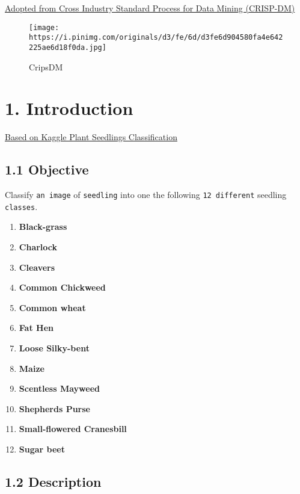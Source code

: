 \documentclass[11pt]{article}
\makeatletter
\def\maxwidth{\ifdim\Gin@nat@width>\linewidth\linewidth
    \else\Gin@nat@width\fi}
\let\Oldincludegraphics\includegraphics
\renewcommand{\includegraphics}[1]{\Oldincludegraphics[width=.8\maxwidth]{#1}}
\providecommand{\tightlist}{%
      \setlength{\itemsep}{0pt}\setlength{\parskip}{0pt}}
\makeatother
\begin{document}
\href{http://www.sv-europe.com/crisp-dm-methodology/}{Adopted from Cross
Industry Standard Process for Data Mining (CRISP-DM)}

\begin{figure}
\centering
\texttt{[image: https://i.pinimg.com/originals/d3/fe/6d/d3fe6d904580fa4e642225ae6d18f0da.jpg]}
\caption{CripsDM}
\end{figure}

    \hypertarget{introduction}{%
\section{1. Introduction}\label{introduction}}

    \href{https://www.kaggle.com/c/plant-seedlings-classification}{Based on
Kaggle Plant Seedlings Classification}

    \hypertarget{objective}{%
\subsection{1.1 Objective}\label{objective}}

    Classify \texttt{an\ image} of \texttt{seedling} into one the following
\texttt{12\ different} seedling \texttt{classes}.

\begin{enumerate}
\def\labelenumi{\arabic{enumi}.}
\tightlist
\item
  \textbf{Black-grass}
\item
  \textbf{Charlock}
\item
  \textbf{Cleavers}
\item
  \textbf{Common Chickweed}
\item
  \textbf{Common wheat}
\item
  \textbf{Fat Hen}
\item
  \textbf{Loose Silky-bent}
\item
  \textbf{Maize}
\item
  \textbf{Scentless Mayweed}
\item
  \textbf{Shepherds Purse}
\item
  \textbf{Small-flowered Cranesbill}
\item
  \textbf{Sugar beet}
\end{enumerate}

    \hypertarget{description}{%
\subsection{1.2 Description}\label{description}}
\end{document}

